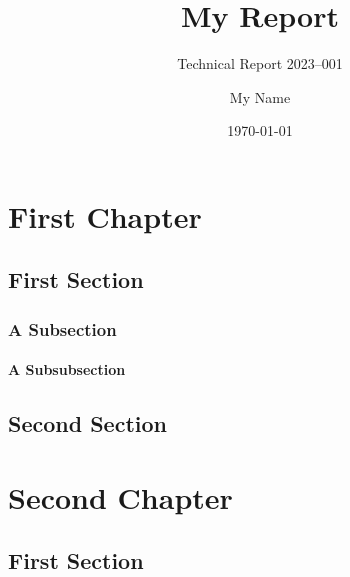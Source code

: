 \documentclass[twoside, english]{sdqtechreport}
\author{My Name}
\title{My Report}
\subtitle{Technical Report 2023–001}
\date{\today}
\begin{document}
\setpdf

\maketitle

\tableofcontents

\cleardoublepage


\chapter{First Chapter}
\label{chap:FirstContent}

\section{First Section}
\label{sec:FirstContent:FirstSection}

\Blindtext

\subsection{A Subsection}
\label{sec:FirstContent:FirstSubSection}

\Blindtext

\subsubsection{A Subsubsection}

\Blindtext[1]

\section{Second Section}
\label{sec:FirstContent:SecondSection}

\Blindtext

\chapter{Second Chapter}
\label{chap:SecondContent}

\section{First Section}
\label{sec:SecondContent:FirstSection}
\end{document}

